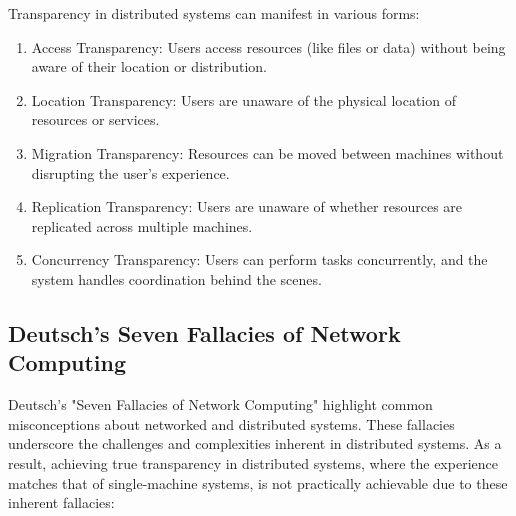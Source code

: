 \documentclass{report}
\begin{document}
Transparency in distributed systems can manifest in various forms:

\begin{enumerate}[label=\textit{(\roman*)}]
\item Access Transparency: Users access resources (like files or data) without being aware of
  their location or distribution.
\item Location Transparency: Users are unaware of the physical location of resources or
  services.
\item Migration Transparency: Resources can be moved between machines without disrupting the
  user's experience.
\item Replication Transparency: Users are unaware of whether resources are replicated across
  multiple machines.
\item Concurrency Transparency: Users can perform tasks concurrently, and the system handles
  coordination behind the scenes.
\end{enumerate}


\subsection{Deutsch's Seven Fallacies of Network Computing}
Deutsch's "Seven Fallacies of Network Computing" highlight common misconceptions about networked and
distributed systems. These fallacies underscore the challenges and complexities inherent in
distributed systems. As a result, achieving true transparency in distributed systems, where the
experience matches that of single-machine systems, is not practically achievable due to these
inherent fallacies:
\end{document}
